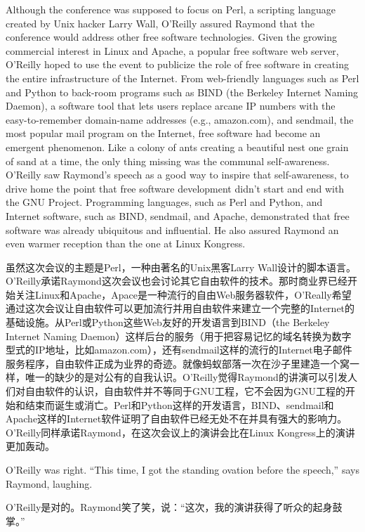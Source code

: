 \ifdefined\eng
Although the conference was supposed to focus on Perl, a scripting language created by Unix hacker Larry Wall, O'Reilly assured Raymond that the conference would address other free software technologies. Given the growing commercial interest in Linux and Apache, a popular free software web server, O'Reilly hoped to use the event to publicize the role of free software in creating the entire infrastructure of the Internet. From web-friendly languages such as Perl and Python to back-room programs such as BIND (the Berkeley Internet Naming Daemon), a software tool that lets users replace arcane IP numbers with the easy-to-remember domain-name addresses (e.g., amazon.com), and sendmail, the most popular mail program on the Internet, free software had become an emergent phenomenon. Like a colony of ants creating a beautiful nest one grain of sand at a time, the only thing missing was the communal self-awareness. O'Reilly saw Raymond's speech as a good way to inspire that self-awareness, to drive home the point that free software development didn't start and end with the GNU Project. Programming languages, such as Perl and Python, and Internet software, such as BIND, sendmail, and Apache, demonstrated that free software was already ubiquitous and influential. He also assured Raymond an even warmer reception than the one at Linux Kongress.
\fi

\ifdefined\chs
虽然这次会议的主题是Perl，一种由著名的Unix黑客Larry Wall设计的脚本语言。O'Reilly承诺Raymond这次会议也会讨论其它自由软件的技术。那时商业界已经开始关注Linux和Apache，Apace是一种流行的自由Web服务器软件，O'Really希望通过这次会议让自由软件可以更加流行并用自由软件来建立一个完整的Internet的基础设施。从Perl或Python这些Web友好的开发语言到BIND（the Berkeley Internet Naming Daemon）这样后台的服务（用于把容易记忆的域名转换为数字型式的IP地址，比如amazon.com），还有sendmail这样的流行的Internet电子邮件服务程序，自由软件正成为业界的奇迹。就像蚂蚁部落一次在沙子里建造一个窝一样，唯一的缺少的是对公有的自我认识。O'Reilly觉得Raymond的讲演可以引发人们对自由软件的认识，自由软件并不等同于GNU工程，它不会因为GNU工程的开始和结束而诞生或消亡。Perl和Python这样的开发语言，BIND、sendmail和Apache这样的Internet软件证明了自由软件已经无处不在并具有强大的影响力。O'Reilly同样承诺Raymond，在这次会议上的演讲会比在Linux Kongress上的演讲更加轰动。
\fi

\ifdefined\eng
O'Reilly was right. ``This time, I got the standing ovation before the speech,'' says Raymond, laughing.
\fi

\ifdefined\chs
O'Reilly是对的。Raymond笑了笑，说：``这次，我的演讲获得了听众的起身鼓掌。''
\fi

